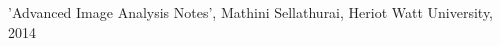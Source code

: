 \documentclass[a4paper, 10pt, conference] {article}
\begin{document}
%   
%  	
  
\begin{thebibliography}{99}

'Advanced Image Analysis Notes', Mathini Sellathurai, Heriot Watt University, 2014
\end{thebibliography}
\end{document}
